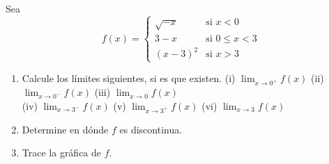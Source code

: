 \item Sea
    $$f(x) = \begin{cases} 
    \sqrt{-x} & \text{si } x < 0 \\ 
    3 - x & \text{si } 0 \le x < 3 \\ 
    (x-3)^2 & \text{si } x > 3 
    \end{cases}$$
    \begin{enumerate}
        \item Calcule los límites siguientes, si es que existen.
        (i) $\lim_{x \to 0^+} f(x)$ \quad (ii) $\lim_{x \to 0^-} f(x)$ \quad (iii) $\lim_{x \to 0} f(x)$ \\
        (iv) $\lim_{x \to 3^-} f(x)$ \quad (v) $\lim_{x \to 3^+} f(x)$ \quad (vi) $\lim_{x \to 3} f(x)$
        \item Determine en dónde $f$ es discontinua.
        \item Trace la gráfica de $f$.
    \end{enumerate}
